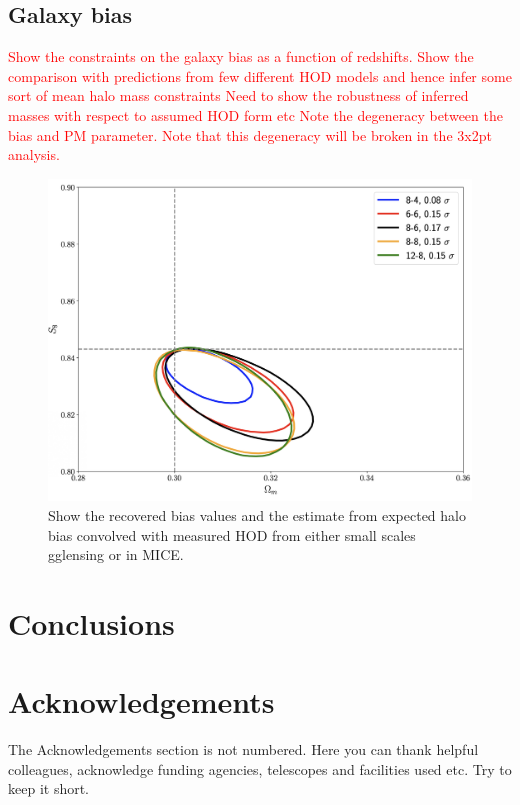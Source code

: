 \documentclass[fleqn,usenatbib]{mnras}
\newcommand{\red}[1]{\textcolor{red}{#1}}
\begin{document}
\subsection{Galaxy bias}
\red{Show the constraints on the galaxy bias as a function of redshifts. }
\red{Show the comparison with predictions from few different HOD models and hence infer some sort of mean halo mass constraints}
\red{Need to show the robustness of inferred masses with respect to assumed HOD form etc}
\red{Note the degeneracy between the bias and PM parameter. Note that this degeneracy will be broken in the 3x2pt analysis.}
\begin{figure}
\includegraphics[width=\columnwidth,draft]{figs/temp.png}
\caption[]{Show the recovered bias values and the estimate from expected halo bias convolved with measured HOD from either small scales gglensing or in MICE. }
\label{fig:bias_relation}
\end{figure}

\section{Conclusions}




\section*{Acknowledgements}

The Acknowledgements section is not numbered. Here you can thank helpful
colleagues, acknowledge funding agencies, telescopes and facilities used etc.
Try to keep it short.
\end{document}
